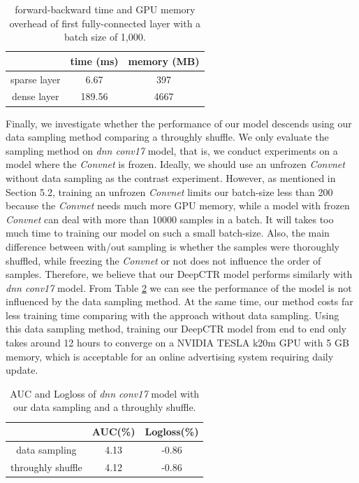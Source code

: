 \documentclass{sig-alternate-05-2015}
\begin{document}
\begin{table}
	\centering
	\caption{forward-backward time and GPU memory overhead of first fully-connected layer with a batch size of 1,000.}
	\label{table:time&memory}
	\begin{tabular}{|c|c|c|} \hline
		& time (ms) & memory (MB)\\ \hline
		sparse layer & 6.67 &397 \\ \hline
		dense layer & 189.56 &4667 \\ \hline
	\end{tabular}
\end{table}

Finally, we investigate whether the performance of our model descends using our data sampling method comparing a throughly shuffle. We only evaluate the sampling method on  \emph{dnn conv17} model, that is, we conduct experiments on a model where the \emph{Convnet} is frozen. Ideally, we should use an unfrozen \emph{Convnet} without data sampling as the contrast experiment. However, as mentioned in Section 5.2, training an unfrozen \emph{Convnet} limits our batch-size less than 200  because the \emph{Convnet} needs much more GPU memory, while a model with frozen \emph{Convnet} can deal with more than 10000 samples in a batch. It will takes too much time to training our model on such a small batch-size. Also, the main difference between with/out sampling is whether the samples were thoroughly shuffled, while freezing the \emph{Convnet} or not does not influence  the order of samples. Therefore, we believe that our  DeepCTR model performs similarly with \emph{dnn conv17} model. From Table \ref{table:datasampling} we can see the performance of the model is not influenced by the data sampling method. At the same time, our method  costs far less training time comparing with the approach without data sampling. Using this data sampling method, training our DeepCTR model from end to end only takes around 12 hours to converge on a NVIDIA TESLA k20m GPU with 5 GB memory, which is acceptable for an online advertising system requiring daily update. 
\begin{table}
	\centering
	\caption{AUC and Logloss of \emph{dnn conv17} model with our data sampling and a throughly shuffle.}
	\label{table:datasampling}
	\begin{tabular}{|c|c|c|} \hline
		& AUC(\%) & Logloss(\%)\\ \hline
		data sampling & 4.13 & -0.86\\ \hline
		throughly shuffle & 4.12 & -0.86\\ \hline
	\end{tabular}
\end{table}
\end{document}
